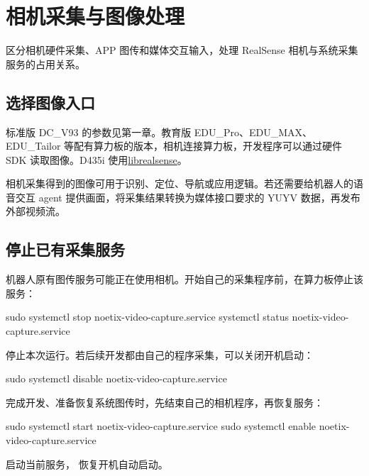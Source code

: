 \chapter{相机采集与图像处理}

\label{chap:camera}
\begin{intro}
区分相机硬件采集、APP 图传和媒体交互输入，处理 RealSense 相机与系统采集服务的占用关系。
\end{intro}
\section{选择图像入口}
标准版 DC\_V93 的参数见第一章。教育版 EDU\_Pro、EDU\_MAX、EDU\_Tailor 等配有算力板的版本，相机连接算力板，开发程序可以通过硬件 SDK 读取图像。D435i 使用\href{https://github.com/IntelRealSense/librealsense}{librealsense}。

相机采集得到的图像可用于识别、定位、导航或应用逻辑。若还需要给机器人的语音交互 agent 提供画面，将采集结果转换为媒体接口要求的 YUYV 数据，再发布外部视频流。
\section{停止已有采集服务}
机器人原有图传服务可能正在使用相机。开始自己的采集程序前，在算力板停止该服务：
\par\noindent\begin{minipage}{\linewidth}
\begin{command}
sudo systemctl stop noetix-video-capture.service
systemctl status noetix-video-capture.service
\end{command}
\end{minipage}\par

 停止本次运行。若后续开发都由自己的程序采集，可以关闭开机启动：
\par\noindent\begin{minipage}{\linewidth}
\begin{command}
sudo systemctl disable noetix-video-capture.service
\end{command}
\end{minipage}\par

完成开发、准备恢复系统图传时，先结束自己的相机程序，再恢复服务：
\par\noindent\begin{minipage}{\linewidth}
\begin{command}
sudo systemctl start noetix-video-capture.service
sudo systemctl enable noetix-video-capture.service
\end{command}
\end{minipage}\par

 启动当前服务， 恢复开机自动启动。
